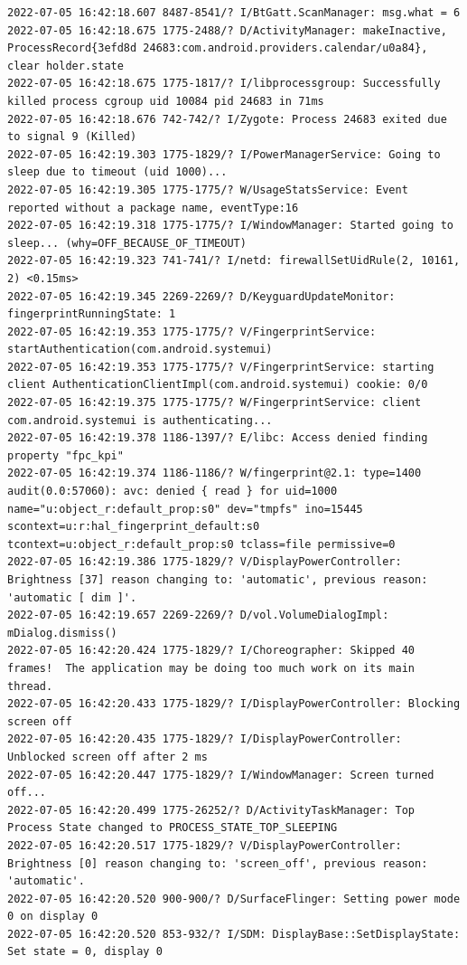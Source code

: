 \documentclass[a4paper,12pt]{book}
\begin{document}
\begin{lstlisting}
2022-07-05 16:42:18.607 8487-8541/? I/BtGatt.ScanManager: msg.what = 6
2022-07-05 16:42:18.675 1775-2488/? D/ActivityManager: makeInactive, ProcessRecord{3efd8d 24683:com.android.providers.calendar/u0a84}, clear holder.state
2022-07-05 16:42:18.675 1775-1817/? I/libprocessgroup: Successfully killed process cgroup uid 10084 pid 24683 in 71ms
2022-07-05 16:42:18.676 742-742/? I/Zygote: Process 24683 exited due to signal 9 (Killed)
2022-07-05 16:42:19.303 1775-1829/? I/PowerManagerService: Going to sleep due to timeout (uid 1000)...
2022-07-05 16:42:19.305 1775-1775/? W/UsageStatsService: Event reported without a package name, eventType:16
2022-07-05 16:42:19.318 1775-1775/? I/WindowManager: Started going to sleep... (why=OFF_BECAUSE_OF_TIMEOUT)
2022-07-05 16:42:19.323 741-741/? I/netd: firewallSetUidRule(2, 10161, 2) <0.15ms>
2022-07-05 16:42:19.345 2269-2269/? D/KeyguardUpdateMonitor: fingerprintRunningState: 1
2022-07-05 16:42:19.353 1775-1775/? V/FingerprintService: startAuthentication(com.android.systemui)
2022-07-05 16:42:19.353 1775-1775/? V/FingerprintService: starting client AuthenticationClientImpl(com.android.systemui) cookie: 0/0
2022-07-05 16:42:19.375 1775-1775/? W/FingerprintService: client com.android.systemui is authenticating...
2022-07-05 16:42:19.378 1186-1397/? E/libc: Access denied finding property "fpc_kpi"
2022-07-05 16:42:19.374 1186-1186/? W/fingerprint@2.1: type=1400 audit(0.0:57060): avc: denied { read } for uid=1000 name="u:object_r:default_prop:s0" dev="tmpfs" ino=15445 scontext=u:r:hal_fingerprint_default:s0 tcontext=u:object_r:default_prop:s0 tclass=file permissive=0
2022-07-05 16:42:19.386 1775-1829/? V/DisplayPowerController: Brightness [37] reason changing to: 'automatic', previous reason: 'automatic [ dim ]'.
2022-07-05 16:42:19.657 2269-2269/? D/vol.VolumeDialogImpl: mDialog.dismiss()
2022-07-05 16:42:20.424 1775-1829/? I/Choreographer: Skipped 40 frames!  The application may be doing too much work on its main thread.
2022-07-05 16:42:20.433 1775-1829/? I/DisplayPowerController: Blocking screen off
2022-07-05 16:42:20.435 1775-1829/? I/DisplayPowerController: Unblocked screen off after 2 ms
2022-07-05 16:42:20.447 1775-1829/? I/WindowManager: Screen turned off...
2022-07-05 16:42:20.499 1775-26252/? D/ActivityTaskManager: Top Process State changed to PROCESS_STATE_TOP_SLEEPING
2022-07-05 16:42:20.517 1775-1829/? V/DisplayPowerController: Brightness [0] reason changing to: 'screen_off', previous reason: 'automatic'.
2022-07-05 16:42:20.520 900-900/? D/SurfaceFlinger: Setting power mode 0 on display 0
2022-07-05 16:42:20.520 853-932/? I/SDM: DisplayBase::SetDisplayState: Set state = 0, display 0

\end{lstlisting}
\end{document}
